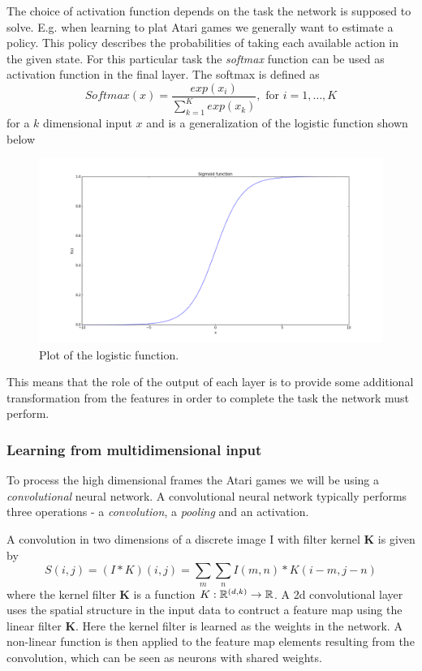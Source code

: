 \documentclass[11pt]{article}
\begin{document}
The choice of activation function depends on the task the
network is supposed to solve.
E.g. when learning to plat Atari games we generally want to estimate a policy.
This policy describes the probabilities of taking each available action
in the given state.
For this particular task the \textit{softmax} function can be used as activation function
in the final layer.
The softmax is defined as
\begin{equation}
    Softmax(x) = \frac{exp(x_i)}{\sum\limits_{k=1}^K exp(x_k)}, \text{ for } i = 1, \dots, K
\end{equation}
for a $k$ dimensional input $x$ and is a generalization of the logistic function shown below

\begin{figure}[!h]
    \centering
    \includegraphics[width=15cm]{include/sigmoid.png}
    \caption{Plot of the logistic function.}
    \label{fig:softmax}
\end{figure}

This means that the role of the output of each layer is to provide some additional
transformation from the features in order to complete the task the network
must perform\cite{DeepLearningBook}.

\subsubsection{Learning from multidimensional input}

To process the high dimensional frames the Atari games we will be using
a \textit{convolutional} neural network.
A convolutional neural network typically performs three operations - a \textit{convolution},
a \textit{pooling} and an activation.

A convolution in two dimensions of a discrete image I with filter kernel \textbf{K}
is given by 
\begin{equation}
    S(i, j) = (I \ast K)(i, j) = \sum\limits_m \sum\limits_n I(m, n) * K(i - m, j - n)
\end{equation}
where the kernel filter \textbf{K} is a function $K : \mathbb{R}^{(d, k)} \to \mathbb{R}$.
A 2d convolutional layer uses the spatial structure in the input data to contruct a feature map
using the linear filter \textbf{K}.
Here the kernel filter is learned as the weights in the network.
A non-linear function is then applied to the feature map elements resulting from the convolution,
which can be seen as neurons with shared weights\cite{IgelConv}.
\end{document}
